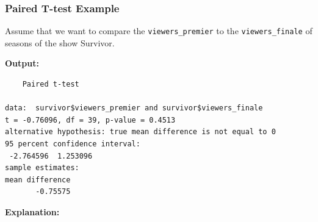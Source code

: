 \documentclass[
]{book}
\newenvironment{Shaded}{\begin{snugshade}}{\end{snugshade}}
\newcommand{\AttributeTok}[1]{\textcolor[rgb]{0.13,0.29,0.53}{#1}}
\newcommand{\CommentTok}[1]{\textcolor[rgb]{0.56,0.35,0.01}{\textit{#1}}}
\newcommand{\ConstantTok}[1]{\textcolor[rgb]{0.56,0.35,0.01}{#1}}
\newcommand{\FunctionTok}[1]{\textcolor[rgb]{0.13,0.29,0.53}{\textbf{#1}}}
\newcommand{\NormalTok}[1]{#1}
\newcommand{\OtherTok}[1]{\textcolor[rgb]{0.56,0.35,0.01}{#1}}
\newcommand{\SpecialCharTok}[1]{\textcolor[rgb]{0.81,0.36,0.00}{\textbf{#1}}}
\begin{document}
\subsubsection*{Paired T-test Example}\label{paired-t-test-example}

Assume that we want to compare the \texttt{viewers\_premier} to the \texttt{viewers\_finale} of seasons of the show Survivor.

\begin{Shaded}
\end{Shaded}

\textbf{Output:}

\begin{verbatim}
    Paired t-test 

data:  survivor$viewers_premier and survivor$viewers_finale
t = -0.76096, df = 39, p-value = 0.4513
alternative hypothesis: true mean difference is not equal to 0
95 percent confidence interval:
 -2.764596  1.253096
sample estimates:
mean difference 
       -0.75575 
\end{verbatim}

\textbf{Explanation:}
\end{document}
